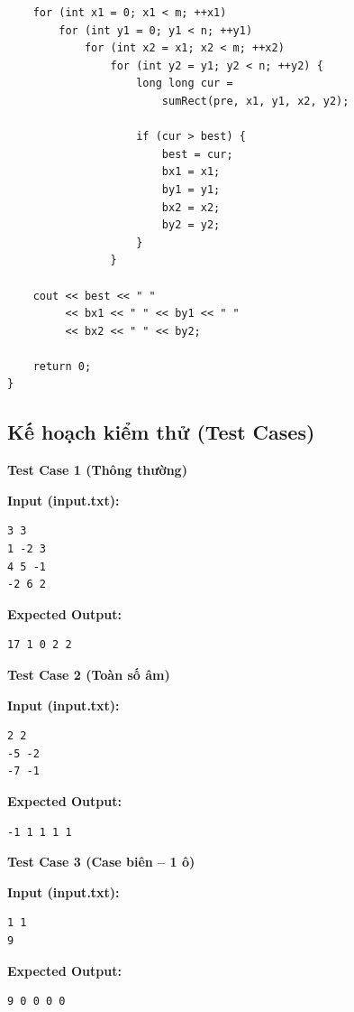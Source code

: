 \begin{lstlisting}
    for (int x1 = 0; x1 < m; ++x1)
        for (int y1 = 0; y1 < n; ++y1)
            for (int x2 = x1; x2 < m; ++x2)
                for (int y2 = y1; y2 < n; ++y2) {
                    long long cur =
                        sumRect(pre, x1, y1, x2, y2);

                    if (cur > best) {
                        best = cur;
                        bx1 = x1;
                        by1 = y1;
                        bx2 = x2;
                        by2 = y2;
                    }
                }

    cout << best << " "
         << bx1 << " " << by1 << " "
         << bx2 << " " << by2;

    return 0;
}
\end{lstlisting}

\subsection{Kế hoạch kiểm thử (Test Cases)}

\textbf{Test Case 1 (Thông thường)}

\textbf{Input (input.txt):}
\begin{lstlisting}
3 3
1 -2 3
4 5 -1
-2 6 2
\end{lstlisting}

\textbf{Expected Output:}
\begin{lstlisting}
17 1 0 2 2
\end{lstlisting}

\vspace{0.5cm}

\textbf{Test Case 2 (Toàn số âm)}

\textbf{Input (input.txt):}
\begin{lstlisting}
2 2
-5 -2
-7 -1
\end{lstlisting}

\textbf{Expected Output:}
\begin{lstlisting}
-1 1 1 1 1
\end{lstlisting}

\vspace{0.5cm}

\textbf{Test Case 3 (Case biên -- 1 ô)}

\textbf{Input (input.txt):}
\begin{lstlisting}
1 1
9
\end{lstlisting}

\textbf{Expected Output:}
\begin{lstlisting}
9 0 0 0 0
\end{lstlisting}